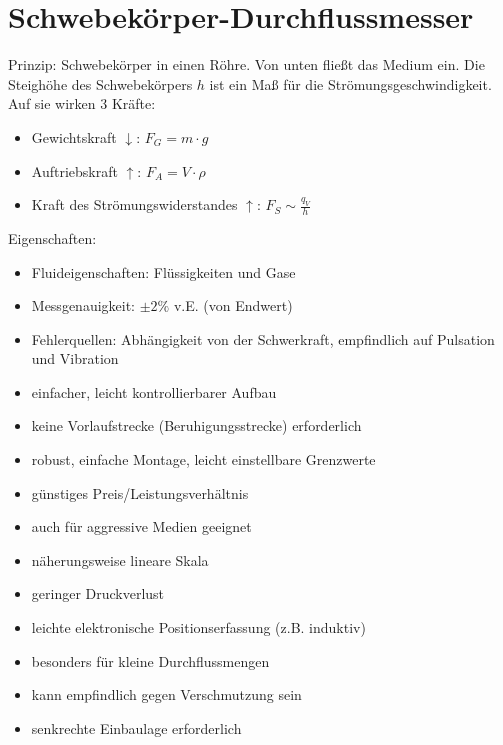 \documentclass{scrreprt}
\begin{document}
\section{Schwebekörper-Durchflussmesser}
Prinzip: Schwebekörper in einen Röhre. Von unten fließt das Medium ein. Die Steighöhe des Schwebekörpers $h$ ist ein Maß für die Strömungsgeschwindigkeit. Auf sie wirken 3 Kräfte:
\begin{itemize}
\item Gewichtskraft $\downarrow$: $F_G=m\cdot g$
\item Auftriebskraft $\uparrow$: $F_A=V\cdot \rho$
\item Kraft des Strömungswiderstandes $\uparrow$: $F_S\sim \frac{q_V}{h}$
\end{itemize}
Eigenschaften:
\begin{itemize}
\item Fluideigenschaften: Flüssigkeiten und Gase
\item Messgenauigkeit: $\pm 2\%$ v.E. (von Endwert)
\item Fehlerquellen: Abhängigkeit von der Schwerkraft, empfindlich auf Pulsation und Vibration
\end{itemize}
\begin{itemize}[label=$+$]
\item einfacher, leicht kontrollierbarer Aufbau
\item keine Vorlaufstrecke (Beruhigungsstrecke) erforderlich
\item robust, einfache Montage, leicht einstellbare Grenzwerte
\item günstiges Preis/Leistungsverhältnis
\item auch für aggressive Medien geeignet
\item näherungsweise lineare Skala
\item geringer Druckverlust
\item leichte elektronische Positionserfassung (z.B. induktiv)
\item besonders für kleine Durchflussmengen
\end{itemize}
\begin{itemize}[label=$-$]
\item kann empfindlich gegen Verschmutzung sein
\item senkrechte Einbaulage erforderlich
\end{itemize}
\end{document}

